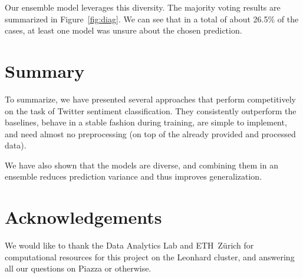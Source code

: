 \documentclass[10pt,conference,compsocconf]{IEEEtran}
\begin{document}
Our ensemble model leverages this diversity. The majority voting results are summarized in Figure~\ref{fig:diag}. We can see that in a total of about 26.5\% of the cases, at least one model was unsure about the chosen prediction.

\section{Summary}
To summarize, we have presented several approaches that perform competitively on the task of Twitter sentiment classification.
They consistently outperform the baselines, behave in a stable fashion during training, are simple to implement, and need almost no preprocessing (on top of the already provided and processed data).

We have also shown that the models are diverse, and combining them in an ensemble reduces prediction variance and thus improves generalization.

\section*{Acknowledgements}

We would like to thank the Data Analytics Lab and ETH~Z\"{u}rich for computational resources for this project on the Leonhard cluster, and answering all our questions on Piazza or otherwise.





\end{document}
